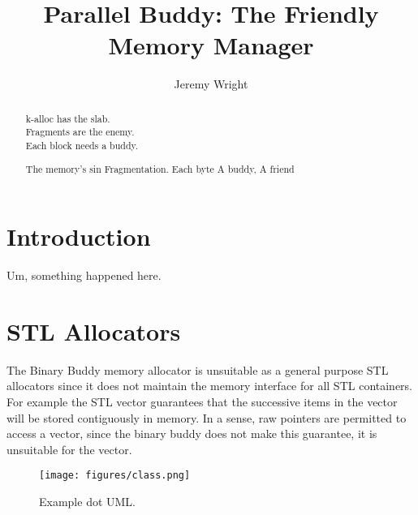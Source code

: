 \documentclass[10pt]{article}
\title{Parallel Buddy: The Friendly Memory Manager}
\author{Jeremy Wright}
\begin{document}
\maketitle

\begin{abstract}
k-alloc has the slab.\\
Fragments are the enemy.\\
Each block needs a buddy.

The memory's sin
Fragmentation. Each byte
A buddy, A friend
 

\end{abstract}

\section{Introduction}
Um, something happened here.


\section{STL Allocators}
The Binary Buddy memory allocator is unsuitable as a general purpose STL
allocators since it does not maintain the memory interface for all STL
containers. For example the STL vector guarantees that the successive items in
the vector will be stored contiguously in memory. In a sense, raw pointers are
permitted to access a vector, since the binary buddy does not make this
guarantee, it is unsuitable for the vector.


\begin{figure*}[h]
\texttt{[image: figures/class.png]}
\caption{Example dot UML.}
\label{fig:example_uml}
\end{figure*}
\end{document}
